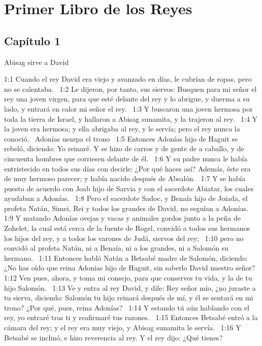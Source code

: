 \chapter{Primer Libro de los  Reyes}

\section*{Capítulo 1}

Abisag sirve a David  

1:1 Cuando el rey David era viejo y avanzado en días, le cubrían de ropas, pero no se calentaba.  
1:2 Le dijeron, por tanto, sus siervos: Busquen para mi señor el rey una joven virgen, para que esté delante del rey y lo abrigue, y duerma a su lado, y entrará en calor mi señor el rey.  
1:3 Y buscaron una joven hermosa por toda la tierra de Israel, y hallaron a Abisag sunamita, y la trajeron al rey.  
1:4 Y la joven era hermosa; y ella abrigaba al rey, y le servía; pero el rey nunca la conoció.  
Adonías usurpa el trono  
1:5 Entonces Adonías hijo de Haguit se rebeló, diciendo: Yo reinaré. Y se hizo de carros y de gente de a caballo, y de cincuenta hombres que corriesen delante de él.  
1:6 Y su padre nunca le había entristecido en todos sus días con decirle: ¿Por qué haces así? Además, éste era de muy hermoso parecer; y había nacido después de Absalón.  
1:7 Y se había puesto de acuerdo con Joab hijo de Sarvia y con el sacerdote Abiatar, los cuales ayudaban a Adonías.  
1:8 Pero el sacerdote Sadoc, y Benaía hijo de Joiada, el profeta Natán, Simei, Rei y todos los grandes de David, no seguían a Adonías.  
1:9 Y matando Adonías ovejas y vacas y animales gordos junto a la peña de Zohelet, la cual está cerca de la fuente de Rogel, convidó a todos sus hermanos los hijos del rey, y a todos los varones de Judá, siervos del rey;  
1:10 pero no convidó al profeta Natán, ni a Benaía, ni a los grandes, ni a Salomón su hermano.  
1:11 Entonces habló Natán a Betsabé madre de Salomón, diciendo: ¿No has oído que reina Adonías hijo de Haguit, sin saberlo David nuestro señor?  
1:12 Ven pues, ahora, y toma mi consejo, para que conserves tu vida, y la de tu hijo Salomón.  
1:13 Ve y entra al rey David, y dile: Rey señor mío, ¿no juraste a tu sierva, diciendo: Salomón tu hijo reinará después de mí, y él se sentará en mi trono? ¿Por qué, pues, reina Adonías?  
1:14 Y estando tú aún hablando con el rey, yo entraré tras ti y reafirmaré tus razones.  
1:15 Entonces Betsabé entró a la cámara del rey; y el rey era muy viejo, y Abisag sunamita le servía.  
1:16 Y Betsabé se inclinó, e hizo reverencia al rey. Y el rey dijo: ¿Qué tienes?  

